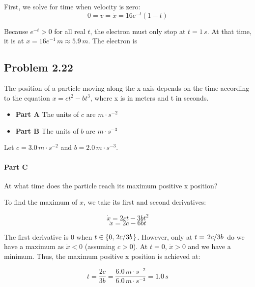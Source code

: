 \documentclass[12pt]{article}
\begin{document}
First, we solve for time when velocity is zero:
\[0 = v = \dot x = 16 e^{-t} (1 - t)\] %

Because $e^{-t} > 0$ for all real $t$, the electron must only stop at $t=1\,\si{s}$. At that time, it is at $x = 16 e^{-1}\,\si{m} \approx 5.9\,\si{m}$. The electron is 

\subsection{Problem 2.22}
The position of a particle moving along the x axis depends on
the time according to the equation $x = c t^2 - bt^3$, where x is in meters and t in seconds.

\begin{itemize}
\item[] \textbf{Part A\:} The units of $c$ are $\boxed{\si{m \cdot s^{-2}}}$
\item[] \textbf{Part B\:} The units of $b$ are $\boxed{\si{m\cdot s^{-3}}}$
\end{itemize}

Let $c = 3.0\,\si{m \cdot s^{-2}}$ and $b = 2.0\, \si{m\cdot s^{-3}}$.

\paragraph{Part C}  At what time does the particle reach its maximum positive x position? \newline

To find the maximum of $x$, we take its first and second derivatives:

\begin{equation}
    \dot x = 2 c t - 3 b t^2 \label{vel22}
\end{equation}
\begin{equation}
    \ddot x = 2 c - 6 b t \label{accel22}
\end{equation}



The first derivative is $0$ when $t \in \{0, \left.{2c}\middle/{3b}\right.\}$. However, only at $t =\left.{2c}\middle/{3b}\right.$ do we have a maximum as $\ddot x < 0$ (assuming $c > 0$). At $t=0$, $\ddot x > 0$ and we have a minimum. Thus, the maximum positive x position is achieved at:

\[
t = \frac{2 c}{3 b} = \frac{6.0\,\si{m \cdot s^{-2}}}{6.0\,\si{m\cdot s^{-3}}} = \boxed{1.0\,\si{s}}
\] \newline
\end{document}
